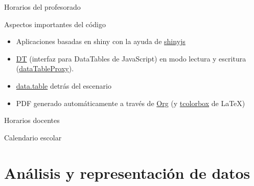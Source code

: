 \documentclass[spanish, xcolor={usenames,svgnames,dvipsnames}]{beamer}
\begin{document}
\begin{frame}[label={sec:orgf86742c}]{Horarios del profesorado}
\begin{block}{Aspectos importantes del código}
\begin{itemize}
\item Aplicaciones basadas en shiny con la ayuda de \href{https://daattali.com/shiny/shinyjs-demo/}{shinyjs}
\item \href{https://github.com/Rdatatable/data.table/wiki}{DT} (interfaz para DataTables de JavaScript) en modo lectura y escritura (\href{https://yihui.shinyapps.io/DT-proxy/}{dataTableProxy}).
\item \href{https://github.com/Rdatatable/data.table/wiki}{data.table} detrás del escenario
\item PDF generado automáticamente a través de \href{http://orgmode.org/}{Org} (y \href{https://www.ctan.org/pkg/tcolorbox}{tcolorbox} de \LaTeX{})
\end{itemize}
\end{block}
\end{frame}
\begin{frame}[label={sec:org1b9d7aa}]{Horarios docentes}
\end{frame}

\begin{frame}[label={sec:org0d227e5}]{Calendario escolar}
\end{frame}

\section{Análisis y representación de datos}
\label{sec:org5317156}
\end{document}
